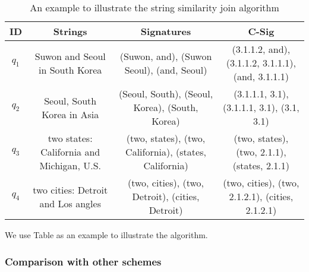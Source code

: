 \begin{table*}[t]
\centering
\begin{tabular}{|@{\hspace{1mm}}c@{\hspace{1mm}}|@{\hspace{1mm}}c@{\hspace{1mm}}|@{\hspace{1mm}}c@{\hspace{1mm}}|@{\hspace{1mm}}c@{\hspace{1mm}}|}
\hline
 \textbf{ID} & \textbf{Strings} &  \textbf{Signatures} &    \textbf{C-Sig} \\
  \hline \hline

  $q_1$ & Suwon and Seoul in South Korea  &  (Suwon, and), (Suwon Seoul), (and, Seoul)  & (3.1.1.2, and), (3.1.1.2, 3.1.1.1), (and, 3.1.1.1) \\

   $q_2$ & Seoul, South Korea in Asia  & (Seoul, South), (Seoul, Korea), (South, Korea) &   (3.1.1.1, 3.1), (3.1.1.1, 3.1), (3.1, 3.1) \\

   $q_3$ &  two states: California and Michigan, U.S. &  (two, states), (two, California), (states, California) & (two, states), (two, 2.1.1), (states, 2.1.1)  \\
   $q_4$ & two cities: Detroit and Los angles & (two, cities), (two, Detroit), (cities, Detroit) &  (two, cities), (two, 2.1.2.1), (cities, 2.1.2.1) \\


  \hline
\end{tabular}
\caption{An example to illustrate the string similarity join algorithm}
\label{tab:example}
\end{table*}


\begin{example} We use Table as an example to illustrate the algorithm.

\end{example}

\subsubsection{Comparison with other schemes}


